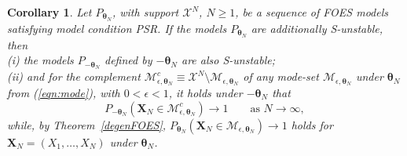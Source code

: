 \documentclass[12pt]{article}
\theoremstyle{definition}
\begin{document}
\newtheorem{corollary1}{Corollary}

  \begin{corollary1}
  \label{sign}
  {\it Let $P_{\boldsymbol \theta_N}$, with support $\mathcal{X}^N$, $N\geq 1$, be a sequence of FOES models satisfying model condition PSR.   If the models $P_{\boldsymbol \theta_N}$  are additionally S-unstable, then \\
  (i) the models  $P_{-\boldsymbol \theta_N}$  defined by $-\boldsymbol \theta_N$  are also S-unstable;\\
  (ii)  and for the complement $\mathcal{M}_{\epsilon, \boldsymbol \theta_N}^c \equiv \mathcal{X}^N \setminus \mathcal{M}_{\epsilon, \boldsymbol \theta_N}$ of any mode-set $\mathcal{M}_{\epsilon, \boldsymbol \theta_N} $ under $\boldsymbol \theta_N$ from (\ref{eqn:mode}), with   $0<\epsilon<1$, it holds under $- \boldsymbol \theta_N$ that
  \[
   P_{-\boldsymbol \theta_N}( \boldsymbol X_N \in \mathcal{M}_{\epsilon, \boldsymbol \theta_N}^c) \rightarrow 1\qquad \mbox{as $N\to \infty$},
  \]
   while,  by Theorem~\ref{degenFOES},  $P_{\boldsymbol \theta_N}( \boldsymbol X_N \in \mathcal{M}_{\epsilon, \boldsymbol \theta_N} ) \rightarrow 1$ holds for
  $ \boldsymbol X_N =(X_1,\ldots,X_N)$ under $  \boldsymbol \theta_N$.}
  \end{corollary1}
\end{document}
